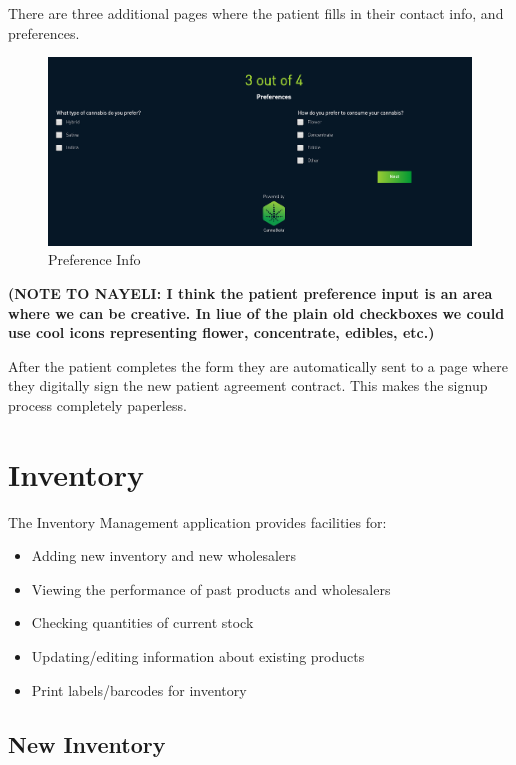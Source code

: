 \documentclass[]{book}
\theoremstyle{definition}
\theoremstyle{definition}
\theoremstyle{definition}
\theoremstyle{remark}
\begin{document}
There are three additional pages where the patient fills in their
contact info, and preferences.

\begin{figure}
\centering
\includegraphics{images/S3.png}
\caption{Preference Info}
\end{figure}

\textbf{(NOTE TO NAYELI: I think the patient preference input is an area
where we can be creative. In liue of the plain old checkboxes we could
use cool icons representing flower, concentrate, edibles, etc.)}

After the patient completes the form they are automatically sent to a
page where they digitally sign the new patient agreement contract. This
makes the signup process completely paperless.

\chapter{Inventory}\label{inventory}

The Inventory Management application provides facilities for:

\begin{itemize}
\item
  Adding new inventory and new wholesalers
\item
  Viewing the performance of past products and wholesalers
\item
  Checking quantities of current stock
\item
  Updating/editing information about existing products
\item
  Print labels/barcodes for inventory
\end{itemize}

\section{New Inventory}\label{new-inventory}
\end{document}
